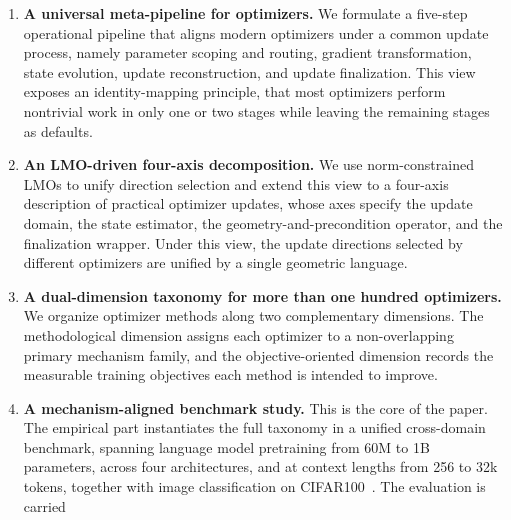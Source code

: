 \begin{enumerate}[leftmargin=*]
  \item \textbf{A universal meta-pipeline for optimizers.}  We
  formulate a five-step operational pipeline that aligns modern optimizers
  under a common update process, namely parameter scoping and routing, gradient
  transformation, state evolution, update reconstruction, and update
  finalization.  This view exposes an identity-mapping principle, that most
  optimizers perform nontrivial work in only one or two stages while leaving
  the remaining stages as defaults.
  \item \textbf{An LMO-driven four-axis decomposition.}  We use
  norm-constrained LMOs to unify direction selection and extend this view to a
  four-axis description of practical optimizer updates, whose axes specify the
  update domain, the state estimator, the geometry-and-precondition operator,
  and the finalization wrapper.  Under this view, the update directions selected
  by different optimizers are unified by a single geometric language.
  \item \textbf{A dual-dimension taxonomy for more than one hundred
  optimizers.}  We organize optimizer methods along two complementary
  dimensions.  The methodological dimension assigns each optimizer to a
  non-overlapping primary mechanism family, and the objective-oriented dimension
  records the measurable training objectives each method is intended to improve.
  \item \textbf{A mechanism-aligned benchmark study.}  This is the core of the
  paper.  The empirical part instantiates the full taxonomy in a unified
  cross-domain benchmark, spanning language model pretraining from 60M to 1B
  parameters, across four architectures, and at context lengths from 256 to 32k
  tokens, together with image classification on CIFAR100~\cite{krizhevsky2009learning}.  The evaluation is carried

\end{enumerate}
